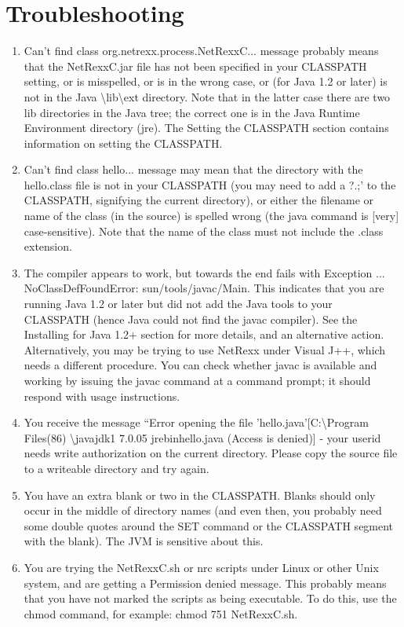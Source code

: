 \chapter{Troubleshooting}
\begin{enumerate} 
\item Can't find class org.netrexx.process.NetRexxC... message
  probably means that the NetRexxC.jar file has not been specified in
  your CLASSPATH setting, or is misspelled, or is in the wrong case,
  or (for Java 1.2 or later) is not in the Java
  \textbackslash lib\textbackslash ext directory. Note that in the latter case there are two lib directories in the Java tree; the correct one is in the Java Runtime Environment directory (jre).
The Setting the CLASSPATH section contains information on setting the CLASSPATH.
\item Can't find class hello... message may mean that the directory with the hello.class file is not in your CLASSPATH (you may need to add a ?.;’ to the CLASSPATH, signifying the current directory), or either the filename or name of the class (in the source) is spelled wrong (the java command is [very] case-sensitive). Note that the name of the class must not include the .class extension.
\item The compiler appears to work, but towards the end fails with Exception ... NoClassDefFoundError: sun/tools/javac/Main. This indicates that you are running Java 1.2 or later but did not add the Java tools to your CLASSPATH (hence Java could not find the javac compiler). See the Installing for Java 1.2+ section for more details, and an alternative action.
Alternatively, you may be trying to use NetRexx under Visual J++, which needs a different procedure. You can check whether javac is available and working by issuing the javac command at a command prompt; it should respond with usage instructions.
\item You receive the message ``Error opening the file 'hello.java'[C:\textbackslash Program Files(86) \textbackslash javajdk1 7.0.05 jrebinhello.java (Access is denied)] - your userid needs write authorization on the current directory. Please copy the source file to a writeable directory and try again.
\item You have an extra blank or two in the CLASSPATH. Blanks should only occur in the middle of directory names (and even then, you probably need some double quotes around the SET command or the CLASSPATH segment with the blank). The JVM is sensitive about this.
\item You are trying the NetRexxC.sh or nrc scripts under Linux or other Unix system, and are getting a Permission denied message. This probably means that you have not marked the scripts as being executable. To do this, use the chmod command, for example: chmod 751 NetRexxC.sh.

\end{enumerate}
